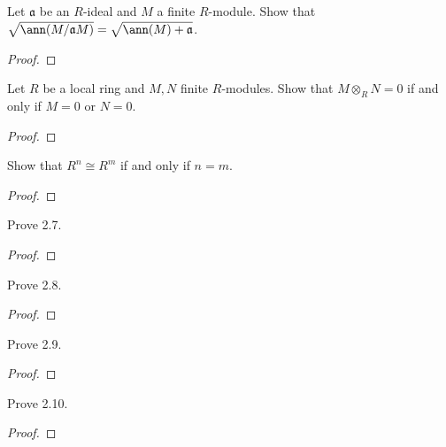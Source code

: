 \begin{problem}
Let $\mathfrak{a}$ be an $R$-ideal and $M$ a finite
$R$-module. Show that
$\sqrt{\ann(M/\mathfrak{a}M)}=\sqrt{\ann(M)+\mathfrak{a}}$.
\end{problem}
\begin{proof}
\end{proof}
\newpage
\begin{problem}
Let $R$ be a local ring and $M,N$ finite $R$-modules. Show that
$M\otimes_R N=0$ if and only if $M=0$ or $N=0$.
\end{problem}
\begin{proof}
\end{proof}
\newpage
\begin{problem}
Show that $R^n\cong R^m$ if and only if $n=m$.
\end{problem}
\begin{proof}
\end{proof}
\newpage
\begin{problem}
Prove 2.7.
\end{problem}
\begin{proof}
\end{proof}
\newpage
\begin{problem}
Prove 2.8.
\end{problem}
\begin{proof}
\end{proof}
\newpage
\begin{problem}
Prove 2.9.
\end{problem}
\begin{proof}
\end{proof}
\newpage
\begin{problem}
Prove 2.10.
\end{problem}
\begin{proof}
\end{proof}

